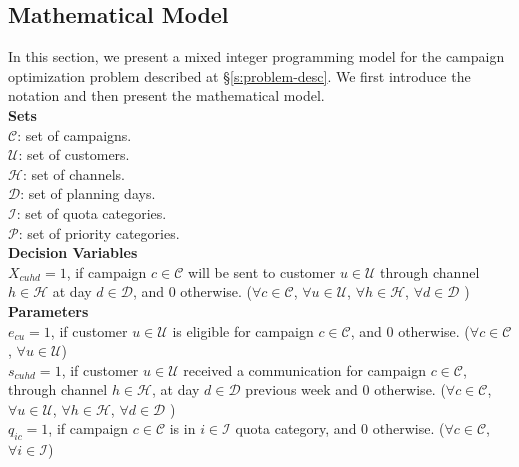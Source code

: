 \documentclass[11pt]{article}
\begin{document}
\subsection{Mathematical Model} \label{s:problem-math}

In this section, we present a mixed integer programming model for the campaign optimization problem described at \S \ref{s:problem-desc}. We first introduce the notation and then present the mathematical model.\\

\noindent \textbf{Sets}\\

\noindent ${\mathcal{C}}$: set of campaigns. \\
\noindent ${\mathcal{U}}$: set of customers. \\
\noindent ${\mathcal{H}}$: set of channels. \\
\noindent ${\mathcal{D}}$: set of planning days. \\
\noindent ${\mathcal{I}}$: set of quota categories. \\
\noindent ${\mathcal{P}}$: set of priority categories. \\

\noindent \textbf{Decision Variables}\\

\noindent $X_{{c}{u}{h}{d}}=1$, if campaign $c \in \mathcal{C}$ will be sent to customer $u \in \mathcal{U}$ through channel $h \in \mathcal{H}$ at day $d \in \mathcal{D}$, and 0 otherwise.
($\forall c \in \mathcal{C}$, $\forall u \in \mathcal{U}$, $\forall h \in \mathcal{H}$, $\forall d \in \mathcal{D}$ )\\

\noindent \textbf{Parameters}\\

\noindent $e_{{c}{u}}=1$, if customer $u \in \mathcal{U}$ is eligible for campaign $c \in \mathcal{C}$, and 0 otherwise.
($\forall c \in \mathcal{C}$, $\forall u \in \mathcal{U}$)\\

\noindent $s_{{c}{u}{h}{d}}=1$, if customer $u \in \mathcal{U}$ received a communication for campaign $c \in \mathcal{C}$, through channel $h \in \mathcal{H}$, at day $d \in \mathcal{D}$ previous week and 0 otherwise.
($\forall c \in \mathcal{C}$, $\forall u \in \mathcal{U}$, $\forall h \in \mathcal{H}$, $\forall d \in \mathcal{D}$ )\\

\noindent $q_{{i}{c}}=1$, if campaign $c \in \mathcal{C}$ is in $i \in \mathcal{I}$ quota category, and 0 otherwise.
($\forall c \in \mathcal{C}$, $\forall i \in \mathcal{I}$)\\
\end{document}
